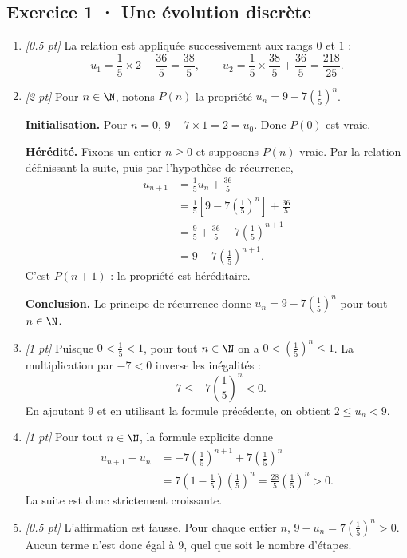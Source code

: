 \subsection*{Exercice 1 · Une évolution discrète}\begin{enumerate}

\item \textit{[\num{0,5} pt]} La relation est appliquée successivement aux rangs $0$ et $1$ :\[u_1=\frac{1}{5}\times 2+\frac{36}{5}=\frac{38}{5},\qquad u_2=\frac{1}{5}\times \frac{38}{5}+\frac{36}{5}=\frac{218}{25}.\]

\item \textit{[2 pt]} Pour $n\in\N$, notons $P(n)$ la propriété $u_n=9-7\left(\frac{1}{5}\right)^n$.
\par\smallskip\textbf{Initialisation.} Pour $n=0$, $9-7\times1=2=u_0$. Donc $P(0)$ est vraie.
\par\smallskip\textbf{Hérédité.} Fixons un entier $n\ge0$ et supposons $P(n)$ vraie. Par la relation définissant la suite, puis par l'hypothèse de récurrence,
\[\begin{aligned}u_{n+1}&=\frac{1}{5}u_n+\frac{36}{5}\\
&=\frac{1}{5}\left[9-7\left(\frac{1}{5}\right)^n\right]+\frac{36}{5}\\
&=\frac{9}{5}+\frac{36}{5}-7\left(\frac{1}{5}\right)^{n+1}\\
&=9-7\left(\frac{1}{5}\right)^{n+1}.
\end{aligned}\]
C'est $P(n+1)$ : la propriété est héréditaire.
\par\smallskip\textbf{Conclusion.} Le principe de récurrence donne $u_n=9-7\left(\frac{1}{5}\right)^n$ pour tout $n\in\N$.

\item \textit{[1 pt]} Puisque $0<\frac{1}{5}<1$, pour tout $n\in\N$ on a $0<(\frac{1}{5})^n\le1$. La multiplication par $-7<0$ inverse les inégalités :
\[-7\le-7(\frac{1}{5})^n<0.\]
En ajoutant $9$ et en utilisant la formule précédente, on obtient $2\le u_n<9$.

\item \textit{[1 pt]} Pour tout $n\in\N$, la formule explicite donne
\[\begin{aligned}u_{n+1}-u_n&=-7(\frac{1}{5})^{n+1}+7(\frac{1}{5})^n\\&=7(1-\frac{1}{5})(\frac{1}{5})^n=\frac{28}{5}(\frac{1}{5})^n>0.\end{aligned}\]
La suite est donc strictement croissante.

\item \textit{[\num{0,5} pt]} L'affirmation est fausse. Pour chaque entier $n$, $9-u_n=7(\frac{1}{5})^n>0$. Aucun terme n'est donc égal à $9$, quel que soit le nombre d'étapes.

\end{enumerate}

